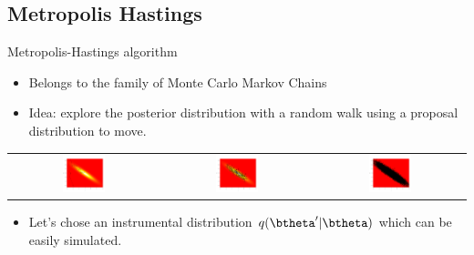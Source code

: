  \subsection{Metropolis Hastings}
\begin{frame}[allowframebreaks]{Metropolis-Hastings algorithm}
\begin{itemize}
 \item  Belongs to the family of  {\vert M}onte {\vert C}arlo {\vert M}arkov {\vert C}hains
 \item \vert Idea\noir: explore the posterior distribution  with a random walk using a proposal distribution to move.
 \end{itemize}
 
 \begin{tabular}{ccc}
  
  \includegraphics[width=0.3\textwidth]{figures/MCMC_chain_debut.png}&
  \includegraphics[width=0.3\textwidth]{figures/MCMC_chain_milieu.png}&\includegraphics[width=0.3\textwidth]{figures/MCMC_plot_50000.png}
% 
 \end{tabular}

\begin{itemize}
 \item Let's chose an instrumental distribution  $q(\btheta' | \btheta)$  which can be easily simulated.  
  \end{itemize}
 

\end{frame}
